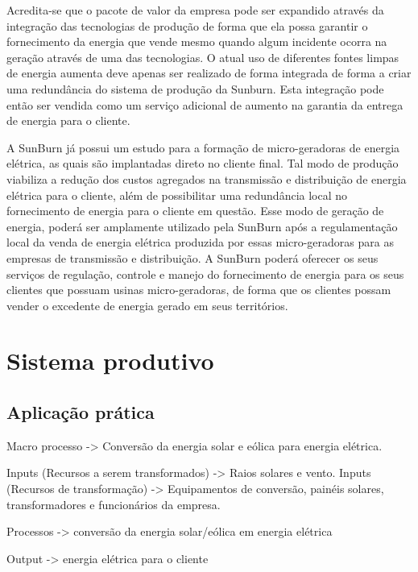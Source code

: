 Acredita-se que o pacote de valor da empresa pode ser expandido através da integração das tecnologias de produção de forma que ela possa garantir o fornecimento da energia que vende mesmo quando algum incidente ocorra na geração através de uma das tecnologias. O atual uso de diferentes fontes limpas de energia aumenta deve apenas ser realizado de forma integrada de forma a criar uma redundância do sistema de produção da Sunburn. Esta integração pode então ser vendida como um serviço adicional de aumento na garantia da entrega de energia para o cliente.

A SunBurn já possui um estudo para a formação de micro-geradoras de energia elétrica, as quais são implantadas direto no cliente final. Tal modo de produção viabiliza a redução dos custos agregados na transmissão e distribuição de energia elétrica para o cliente, além de possibilitar uma redundância local no fornecimento de energia para o cliente em questão. Esse modo de geração de energia, poderá ser amplamente utilizado pela SunBurn após a regulamentação local da venda de energia elétrica produzida por essas micro-geradoras para as empresas de transmissão e distribuição. A SunBurn poderá oferecer os seus serviços de regulação, controle e manejo do fornecimento de energia para os seus clientes que possuam usinas micro-geradoras, de forma que os clientes possam vender o excedente de energia gerado em seus territórios.

\section{Sistema produtivo}
\label{sec:sisprod}

\subsection{Aplicação prática}
\label{subsec:app2}
Macro processo -> Conversão da energia solar e eólica para  energia elétrica.

Inputs (Recursos a serem transformados) -> Raios solares e vento.
Inputs (Recursos de transformação) -> Equipamentos de conversão, painéis solares, transformadores e funcionários da empresa.

Processos -> conversão da energia solar/eólica em energia elétrica

Output -> energia elétrica para o cliente
